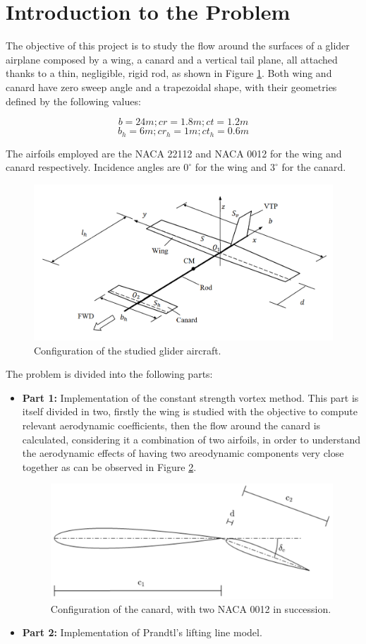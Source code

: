 \section{Introduction to the Problem}

The objective of this project is to study the flow around the surfaces of a glider airplane composed by a wing, a canard and a vertical tail plane, all attached thanks to a thin, negligible, rigid rod, as shown in Figure \ref{fig:GliderConfig}. Both wing and canard have zero sweep angle and a trapezoidal shape, with their geometries defined by the following values:

\[b = 24 m;     cr = 1.8 m;     ct = 1.2 m\]
\[b_h = 6 m;     cr_h = 1 m;     ct_h = 0.6 m\]

The airfoils employed are the NACA 22112 and NACA 0012 for the wing and canard respectively. Incidence angles are $0^\circ$ for the wing and $3^\circ$ for the canard.

\begin{figure}[H]
    \centering
    \includegraphics[width=0.8\linewidth]{imatges/gliderconfig.png}
    \caption{Configuration of the studied glider aircraft.}
    \label{fig:GliderConfig}
\end{figure}

The problem is divided into the following parts:
\begin{itemize}
    \item \textbf{Part 1:} Implementation of the constant strength vortex method. This part is itself divided in two, firstly the wing is studied with the objective to compute relevant aerodynamic coefficients, then the flow around the canard is calculated, considering it a combination of two airfoils, in order to understand the aerodynamic effects of having two areodynamic components very close together as can be observed in Figure \ref{fig:CanardConfig}.
    
    \begin{figure}[H]
        \centering
        \includegraphics[width=0.4\linewidth]{imatges/canardconfig.png}
        \caption{Configuration of the canard, with two NACA 0012 in succession.}
        \label{fig:CanardConfig}
    \end{figure}
    
    \item \textbf{Part 2:} Implementation of Prandtl's lifting line model.

\end{itemize}
